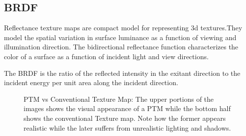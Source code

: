 \subsection{BRDF}

Reflectance texture maps are compact model for representing 3d textures.They model the spatial
variation in surface luminance as a function of viewing and illumination direction.
The bidirectional reflectance function \cite{C3} characterizes the color of a surface as a function
of incident light and view directions.

The BRDF is the ratio of the reflected intensity in the exitant direction to the incident
energy per unit area along the incident direction.
\begin{center}
\begin{figure}[t]
\centering
{} \caption{PTM vs Conventional Texture Map: The upper portions of the images shows the visual appearance of
a PTM while the bottom half shows the conventional Texture map. Note how the former appears realistic while
the later suffers from unrealistic lighting and shadows.
} \label{fig:subfigureExample}
\end{figure}
\end{center}
